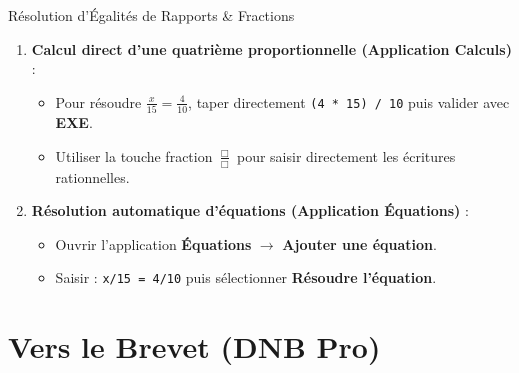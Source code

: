 \begin{tpinfo}{Résolution d'Égalités de Rapports \& Fractions}
\begin{enumerate}[leftmargin=1.5em, itemsep=2pt]
    \item \textbf{Calcul direct d'une quatrième proportionnelle (Application Calculs)} :
    \begin{itemize}
        \item Pour résoudre $\frac{x}{15} = \frac{4}{10}$, taper directement \texttt{(4 * 15) / 10} puis valider avec \textbf{EXE}.
        \item Utiliser la touche fraction $\mathbf{\frac{\Box}{\Box}}$ pour saisir directement les écritures rationnelles.
    \end{itemize}
    \item \textbf{Résolution automatique d'équations (Application Équations)} :
    \begin{itemize}
        \item Ouvrir l'application \textbf{Équations} $\rightarrow$ \textbf{Ajouter une équation}.
        \item Saisir : \texttt{x/15 = 4/10} puis sélectionner \textbf{Résoudre l'équation}.
    \end{itemize}
\end{enumerate}
\end{tpinfo}

\newpage

\section{Vers le Brevet (DNB Pro)}

